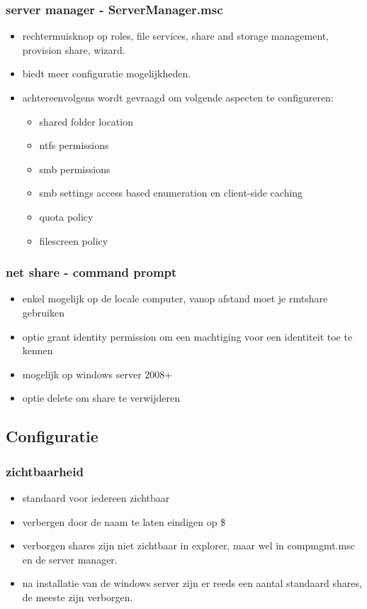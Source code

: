 \subsubsection{server manager - ServerManager.msc}
\begin{itemize}
\item rechtermuisknop op roles, file services, share and storage management, provision share, wizard.
\item biedt meer configuratie mogelijkheden.
\item achtereenvolgens wordt gevraagd om volgende aspecten te configureren:
\begin{itemize}
\item shared folder location
\item ntfs permissions
\item smb permissions
\item smb settings  access based enumeration en client-side caching
\item quota policy
\item filescreen policy
\end{itemize}
\end{itemize}

\subsubsection{net share - command prompt}
\begin{itemize}
\item enkel mogelijk op de locale computer, vanop afstand moet je rmtshare gebruiken
\item optie grant identity permission om een machtiging voor een identiteit toe te kennen
\item mogelijk op windows server 2008+
\item optie delete om share te verwijderen
\end{itemize}

\subsection{Configuratie}
\subsubsection{zichtbaarheid}
\begin{itemize}
\item standaard voor iedereen zichtbaar
\item verbergen door de naam te laten eindigen op \$
\item verborgen shares zijn niet zichtbaar in explorer, maar wel in compmgmt.msc en de server manager.
\item na installatie van de windows server zijn er reeds een aantal standaard shares, de meeste zijn verborgen.
\end{itemize}

